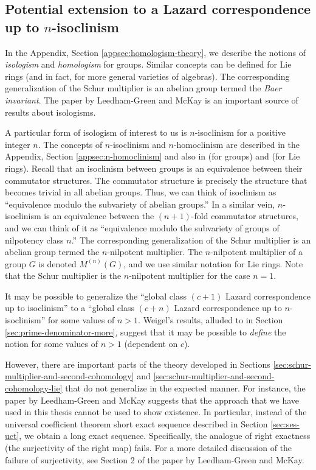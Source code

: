 \subsection{Potential extension to a Lazard correspondence up to $n$-isoclinism}\label{sec:potential-extension-n-isoclinism}

In the Appendix, Section \ref{appsec:homologism-theory}, we describe
the notions of {\em isologism} and {\em homologism} for
groups. Similar concepts can be defined for Lie rings (and in fact,
for more general varieties of algebras).  The corresponding
generalization of the Schur multiplier is an abelian group termed the
{\em Baer invariant}. The paper \cite{Baerinvariantsandisolosigms} by
Leedham-Green and McKay is an important source of results about
isologisms.

A particular form of isologism of interest to us is $n$-isoclinism for
a positive integer $n$. The concepts of $n$-isoclinism and
$n$-homoclinism are described in the Appendix, Section
\ref{appsec:n-homoclinism} and also in \cite{Hekster} (for groups) and
\cite{Moghaddametal} (for Lie rings). Recall that an isoclinism
between groups is an equivalence between their commutator
structures. The commutator structure is precisely the structure that
becomes trivial in all abelian groups. Thus, we can think of
isoclinism as ``equivalence modulo the subvariety of abelian groups.''
In a similar vein, $n$-isoclinism is an equivalence between the
$(n+1)$-fold commutator structures, and we can think of it as
``equivalence modulo the subvariety of groups of nilpotency class
$n$.'' The corresponding generalization of the Schur multiplier is an
abelian group termed the $n$-nilpotent multiplier. The $n$-nilpotent
multiplier of a group $G$ is denoted $M^{(n)}(G)$, and we use similar
notation for Lie rings. Note that the Schur multiplier is the
$n$-nilpotent multiplier for the case $n = 1$.

It may be possible to generalize the ``global class $(c + 1)$ Lazard
correspondence up to isoclinism'' to a ``global class $(c + n)$ Lazard
correspondence up to $n$-isoclinism'' for some values of $n >
1$. Weigel's results, alluded to in Section
\ref{sec:prime-denominator-more}, suggest that it may be possible to
    {\em define} the notion for some values of $n > 1$ (dependent on
    $c$). 

However, there are important parts of the theory developed in Sections
\ref{sec:schur-multiplier-and-second-cohomology} and
\ref{sec:schur-multiplier-and-second-cohomology-lie} that do not
generalize in the expected manner. For instance, the paper
\cite{Baerinvariantsandisolosigms} by Leedham-Green and McKay suggests
that the approach that we have used in this thesis cannot be used to
show existence. In particular, instead of the universal coefficient
theorem short exact sequence described in Section \ref{sec:ses-uct},
we obtain a long exact sequence. Specifically, the analogue of right
exactness (the surjectivity of the right map) fails. For a more
detailed discussion of the failure of surjectivity, see Section 2 of
the paper by Leedham-Green and McKay.

